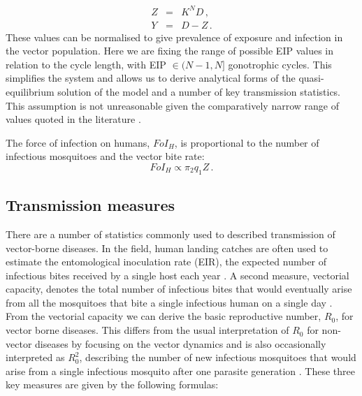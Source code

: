 \begin{eqnarray}
Z &=& K^ND\,,\\
Y &=& D - Z\,.
\end{eqnarray}
These values can be normalised to give prevalence of exposure and infection in the vector population. Here we are fixing the range of possible EIP values in relation to the cycle length, with EIP $\in (N-1,N]$ gonotrophic cycles. This simplifies the system and allows us to derive analytical forms of the quasi-equilibrium solution of the model and a number of key transmission statistics. This assumption is not unreasonable given the comparatively narrow range of values quoted in the literature \cite{erickson2009}.

The force of infection on humans, $FoI_H$, is proportional to the number of infectious mosquitoes and the vector bite rate:
\begin{equation}
FoI_H \propto \pi_2q_1Z\,.
\end{equation}

\subsection{Transmission measures}
\label{sec:EpiMeasures}

There are a number of statistics commonly used to described transmission of vector-borne diseases. In the field, human landing catches are often used to estimate the entomological inoculation rate (EIR), the expected number of infectious bites received by a single host each year \cite{Kilama2014}. A second measure, vectorial capacity, denotes the total number of infectious bites that would eventually arise from all the mosquitoes that bite a single infectious human on a single day \cite{Smith2010}. From the vectorial capacity we can derive the basic reproductive number, $R_0$, for vector borne diseases. This differs from the usual interpretation of $R_0$ for non-vector diseases by focusing on the vector dynamics and is also occasionally interpreted as $R_0^2$, describing the number of new infectious mosquitoes that would arise from a single infectious mosquito after one parasite generation \cite{Smith2010}. These three key measures are given by the following formulas:

